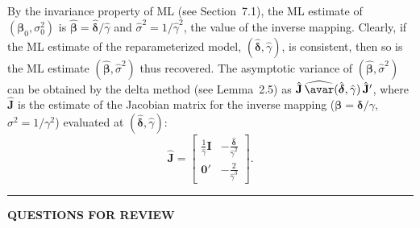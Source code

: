 By the invariance property of ML (see Section~7.1), the ML estimate of
$(\boldsymbol{\beta}_0, \sigma_0^2)$
is $\hat{\boldsymbol{\beta}} = \hat{\boldsymbol{\delta}}/\hat{\gamma}$ and
$\hat{\sigma}^2 = 1/\hat{\gamma}^2$, the value of the inverse mapping. Clearly, if the ML
estimate of the reparameterized model, $(\hat{\boldsymbol{\delta}}, \hat{\gamma})$, is consistent, then so is the ML estimate $(\hat{\boldsymbol{\beta}}, \hat{\sigma}^2)$ thus recovered. The asymptotic variance of
$(\hat{\boldsymbol{\beta}}, \hat{\sigma}^2)$ can be obtained
by the delta method (see Lemma~2.5) as
$\hat{\mathbf{J}}\,\widehat{\avar}(\hat{\boldsymbol{\delta}}, \hat{\gamma})\,\hat{\mathbf{J}}'$,
where $\hat{\mathbf{J}}$ is the estimate of the Jacobian matrix for the inverse mapping
($\boldsymbol{\beta} = \boldsymbol{\delta}/\gamma$, $\sigma^2 = 1/\gamma^2$) evaluated at
$(\hat{\boldsymbol{\delta}}, \hat{\gamma})$:
\begin{equation}
  \hat{\mathbf{J}} = \begin{bmatrix}
    \frac{1}{\hat{\gamma}}\mathbf{I} & -\frac{\hat{\boldsymbol{\delta}}}{\hat{\gamma}^2} \\[6pt]
    \mathbf{0}' & -\frac{2}{\hat{\gamma}^3}
  \end{bmatrix}.
  \label{eq:8.2.18} \tag{8.2.18}
\end{equation}

\bigskip
\noindent\rule{\textwidth}{0.4pt}
\textbf{QUESTIONS FOR REVIEW}
\medskip


